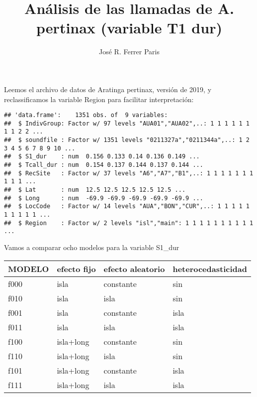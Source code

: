 \documentclass[]{article}
\title{Análisis de las llamadas de A. pertinax (variable T1 dur)}
\author{José R. Ferrer Paris}
\date{}
\newenvironment{Shaded}{\begin{snugshade}}{\end{snugshade}}
\newcommand{\DataTypeTok}[1]{\textcolor[rgb]{0.13,0.29,0.53}{#1}}
\newcommand{\KeywordTok}[1]{\textcolor[rgb]{0.13,0.29,0.53}{\textbf{#1}}}
\newcommand{\NormalTok}[1]{#1}
\newcommand{\OperatorTok}[1]{\textcolor[rgb]{0.81,0.36,0.00}{\textbf{#1}}}
\newcommand{\StringTok}[1]{\textcolor[rgb]{0.31,0.60,0.02}{#1}}
\begin{document}
\maketitle

Leemos el archivo de datos de Aratinga pertinax, versión de 2019, y
reclassificamos la variable Region para facilitar interpretación:

\begin{Shaded}
\end{Shaded}

\begin{verbatim}
## 'data.frame':    1351 obs. of  9 variables:
##  $ IndivGroup: Factor w/ 97 levels "AUA01","AUA02",..: 1 1 1 1 1 1 1 1 2 2 ...
##  $ soundfile : Factor w/ 1351 levels "0211327a","0211344a",..: 1 2 3 4 5 6 7 8 9 10 ...
##  $ S1_dur    : num  0.156 0.133 0.14 0.136 0.149 ...
##  $ Tcall_dur : num  0.154 0.137 0.144 0.137 0.144 ...
##  $ RecSite   : Factor w/ 37 levels "A6","A7","B1",..: 1 1 1 1 1 1 1 1 1 1 ...
##  $ Lat       : num  12.5 12.5 12.5 12.5 12.5 ...
##  $ Long      : num  -69.9 -69.9 -69.9 -69.9 -69.9 ...
##  $ LocCode   : Factor w/ 14 levels "AUA","BON","CUR",..: 1 1 1 1 1 1 1 1 1 1 ...
##  $ Region    : Factor w/ 2 levels "isl","main": 1 1 1 1 1 1 1 1 1 1 ...
\end{verbatim}

\begin{Shaded}
\end{Shaded}

Vamos a comparar ocho modelos para la variable S1\_dur

\begin{longtable}[]{@{}llll@{}}
\toprule
MODELO & efecto fijo & efecto aleatorio &
heterocedasticidad\tabularnewline
\midrule
\endhead
f000 & isla & constante & sin\tabularnewline
f010 & isla & isla & sin\tabularnewline
f001 & isla & constante & isla\tabularnewline
f011 & isla & isla & isla\tabularnewline
f100 & isla+long & constante & sin\tabularnewline
f110 & isla+long & isla & sin\tabularnewline
f101 & isla+long & constante & isla\tabularnewline
f111 & isla+long & isla & isla\tabularnewline
\bottomrule
\end{longtable}
\end{document}
